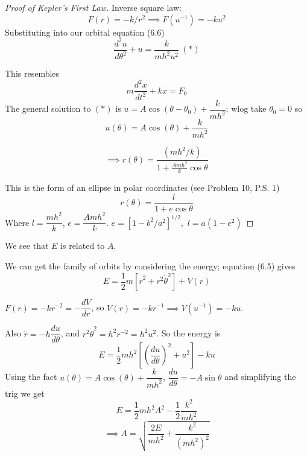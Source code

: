 \documentclass[10pt]{scrartcl}
\begin{document}
\begin{proof}[Proof of Kepler's First Law]
Inverse square law:
\[F(r) = -k/r^2 \implies F(u^{-1}) = -ku^2\]
Substituting into our orbital equation (6.6)
\[\frac{d^2u}{d\theta^2} + u = \frac{k}{mh^2u^2} ~(*)\]

This resembles \[m\frac{d^2x}{dt^2} + kx = F_0\]
The general solution to $(*)$ is $u = A\cos(\theta-\theta_0) + \dfrac{k}{mh^2}$;
 wlog take $\theta_0 = 0$ so
\[u(\theta) = A\cos(\theta) + \dfrac{k}{mh^2}\]

\begin{equation}\implies r(\theta) = \frac{(mh^2/k)}{1 + \frac{Amh^2}{k}\cos\theta}\end{equation}

This is the form of an ellipse in polar coordinates (see Problem 10, P.S. 1)
\[r(\theta) = \frac{l}{1 + e\cos\theta}\]
Where $l = \dfrac{mh^2}{k}$, $e = \dfrac{Amh^2}{k}$. $e = [1-b^2/a^2]^{1/2}$,~$l = a(1-e^2)$ \end{proof}

    \begin{center}
    \end{center}

We see that $E$ is related to $A$.
 
We can get the family of orbits by considering the energy; equation (6.5) gives
\[E = \frac{1}{2}m[\dot{r}^2 + r^2\dot{\theta}^2] + V(r)\]
 
 
 $F(r) =-kr^{-2} = -\dfrac{dV}{dr}$, so $ V(r) = -kr^{-1} \implies V(u^{-1}) = -ku$. 

Also $\dot{r} = -h\dfrac{du}{d\theta}$, and $r^2\dot{\theta}^2 = h^2r^{-2} = h^2u^2$. So the energy is
\[E = \frac{1}{2}mh^2\left[\left(\frac{du}{d\theta}\right)^2 + u^2\right]-ku\]
Using the fact $u(\theta) = A\cos(\theta) + \dfrac{k}{mh^2}$, $\dfrac{du}{d\theta} = -A\sin\theta$ and simplifying the trig we get
\[E = \frac{1}{2}mh^2A^2 - \frac{1}{2}\frac{k^2}{mh^2}\]
\[\implies A = \sqrt{\frac{2E}{mh^2} + \frac{k^2}{(mh^2)^2} }\]~
\end{document}
